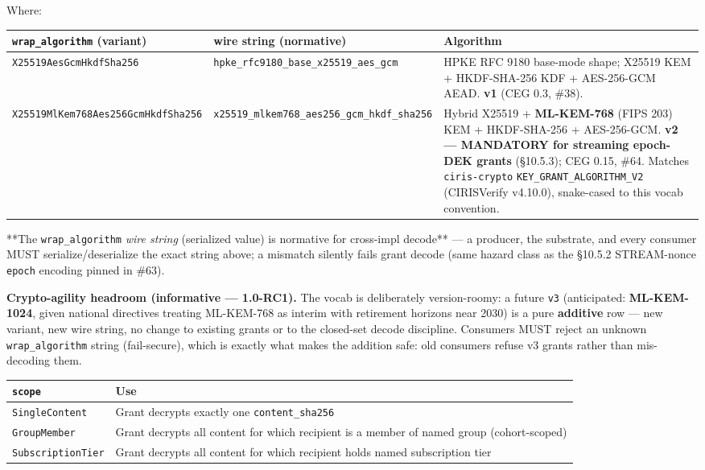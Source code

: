 \documentclass[10pt]{article}
\begin{document}
Where:


{\footnotesize
\begin{longtable}{|p{5.33cm}|p{5.33cm}|p{5.33cm}|}\hline
\textbf{\texttt{wrap\_algorithm} (variant)} & \textbf{wire string (normative)} & \textbf{Algorithm} \\ \hline\endhead
\texttt{X25519AesGcmHkdfSha256} & \texttt{hpke\_rfc9180\_base\_x25519\_aes\_gcm} & HPKE RFC 9180 base-mode shape; X25519 KEM + HKDF-SHA-256 KDF + AES-256-GCM AEAD. \textbf{v1} (CEG 0.3, \#38). \\ \hline
\texttt{X25519MlKem768Aes256GcmHkdfSha256} & \texttt{x25519\_mlkem768\_aes256\_gcm\_hkdf\_sha256} & Hybrid X25519 + \textbf{ML-KEM-768} (FIPS 203) KEM + HKDF-SHA-256 + AES-256-GCM. \textbf{v2 — MANDATORY for streaming epoch-DEK grants} (§10.5.3); CEG 0.15, \#64. Matches \texttt{ciris-crypto} \texttt{KEY\_GRANT\_ALGORITHM\_V2} (CIRISVerify v4.10.0), snake-cased to this vocab convention. \\ \hline
\end{longtable}}


**The \texttt{wrap\_algorithm} \textit{wire string} (serialized value) is normative for cross-impl decode** — a producer, the substrate, and every consumer MUST serialize/deserialize the exact string above; a mismatch silently fails grant decode (same hazard class as the §10.5.2 STREAM-nonce \texttt{epoch} encoding pinned in \#63).


\textbf{Crypto-agility headroom (informative — 1.0-RC1).} The vocab is deliberately version-roomy: a future \texttt{v3} (anticipated: \textbf{ML-KEM-1024}, given national directives treating ML-KEM-768 as interim with retirement horizons near 2030) is a pure \textbf{additive} row — new variant, new wire string, no change to existing grants or to the closed-set decode discipline. Consumers MUST reject an unknown \texttt{wrap\_algorithm} string (fail-secure), which is exactly what makes the addition safe: old consumers refuse v3 grants rather than mis-decoding them.


{\footnotesize
\begin{longtable}{|p{8.0cm}|p{8.0cm}|}\hline
\textbf{\texttt{scope}} & \textbf{Use} \\ \hline\endhead
\texttt{SingleContent} & Grant decrypts exactly one \texttt{content\_sha256} \\ \hline
\texttt{GroupMember} & Grant decrypts all content for which recipient is a member of named group (cohort-scoped) \\ \hline
\texttt{SubscriptionTier} & Grant decrypts all content for which recipient holds named subscription tier \\ \hline
\end{longtable}}
\end{document}

